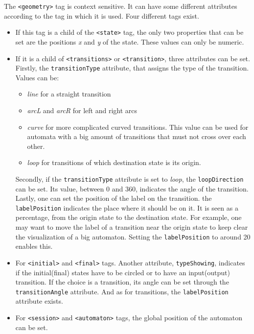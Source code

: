 \documentclass[a4paper]{article}
\newcommand{\xtag}[1]{\texttt{<#1>}}
\newcommand{\xattr}[1]{\texttt{#1}}
\begin{document}
The \xtag{geometry} tag is context sensitive. It can have some different
attributes according to the tag in which it is used. Four different tags exist.
\begin{itemize}
\item If this tag is a child of the \xtag{state} tag, the only two properties
  that can be set are the positions \textit{x} and \textit{y} of the state.
  These values can only be numeric.

\item If it is a child of \xtag{transitions} or \xtag{transition},
  three attributes can be set. Firstly, the \xattr{transitionType}
  attribute, that assigns the type of the transition. Values can be:
  \begin{itemize}
  \item \textit{line} for a straight transition
  \item \textit{arcL} and \textit{arcR} for left and right arcs
  \item \textit{curve} for more complicated curved transitions. This value can
    be used for automata with a big amount of transitions that must not cross
    over each other.
  \item \textit{loop} for transitions of which destination state is its origin.
  \end{itemize}
  Secondly, if the \xattr{transitionType} attribute is set to \textit{loop}, the
  \xattr{loopDirection} can be set. Its value, between 0 and 360, indicates
  the angle of the transition.\\ Lastly, one can set the position of the label
  on the transition. the \xattr{labelPosition} indicates the place where it
  should be on it. It is seen as a percentage, from the origin state to
  the destination state.  For example, one may want to move the label of a
  transition near the origin state to keep clear the visualization of a big
  automaton. Setting the \xattr{labelPosition} to around 20 enables this.

\item For \xtag{initial} and \xtag{final} tags. Another attribute,
  \xattr{typeShowing}, indicates if the initial(final) states have to be circled
  or to have an input(output) transition. If the choice is a transition, its
  angle can be set through the \xattr{transitionAngle} attribute. And as for
  transitions, the \xattr{labelPosition} attribute exists.

\item For \xtag{session} and \xtag{automaton} tags, the global position of the
  automaton can be set.
\end{itemize}
\end{document}
